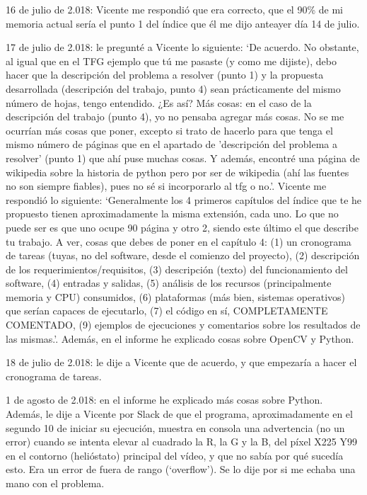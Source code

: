 \documentclass[12pt]{article}
\begin{document}
16 de julio de 2.018: Vicente me respondió que era correcto, que el 90\% de mi memoria actual sería el punto 1 del índice que él me dijo anteayer día 14 de julio.

17 de julio de 2.018: le pregunté a Vicente lo siguiente: ‘De acuerdo. No obstante, al igual que en el TFG ejemplo que tú me pasaste (y como me dijiste), debo hacer que la descripción del problema a resolver (punto 1) y la propuesta desarrollada (descripción del trabajo, punto 4) sean prácticamente del mismo número de hojas, tengo entendido. ¿Es así? Más cosas: en el caso de la descripción del trabajo (punto 4), yo no pensaba agregar más cosas. No se me ocurrían más cosas que poner, excepto si trato de hacerlo para que tenga el mismo número de páginas que en el apartado de 'descripción del problema a resolver' (punto 1) que ahí puse muchas cosas. Y además, encontré una página de wikipedia sobre la historia de python pero por ser de wikipedia (ahí las fuentes no son siempre fiables), pues no sé si incorporarlo al tfg o no.’. Vicente me respondió lo siguiente: ‘Generalmente los 4 primeros capítulos del índice que te he propuesto tienen aproximadamente la misma extensión, cada uno. Lo que no puede ser es que uno ocupe 90 página y otro 2, siendo este último el que describe tu trabajo. A ver, cosas que debes de poner en el capítulo 4: (1) un cronograma de tareas (tuyas, no del software, desde el comienzo del proyecto), (2) descripción de los requerimientos/requisitos, (3) descripción (texto) del funcionamiento del software, (4) entradas y salidas, (5) análisis de los recursos (principalmente memoria y CPU) consumidos, (6) plataformas (más bien, sistemas operativos) que serían capaces de ejecutarlo, (7) el código en sí, COMPLETAMENTE COMENTADO, (9) ejemplos de ejecuciones y comentarios sobre los resultados de las mismas.’. Además, en el informe he explicado cosas sobre OpenCV y Python.

18 de julio de 2.018: le dije a Vicente que de acuerdo, y que empezaría a hacer el cronograma de tareas.

1 de agosto de 2.018: en el informe he explicado más cosas sobre Python. Además, le dije a Vicente por Slack de que el programa, aproximadamente en el segundo 10 de iniciar su ejecución, muestra en consola una advertencia (no un error) cuando se intenta elevar al cuadrado la R, la G y la B, del píxel X225 Y99 en el contorno (helióstato) principal del vídeo, y que no sabía por qué sucedía esto. Era un error de fuera de rango (‘overflow’). Se lo dije por si me echaba una mano con el problema.
\end{document}
